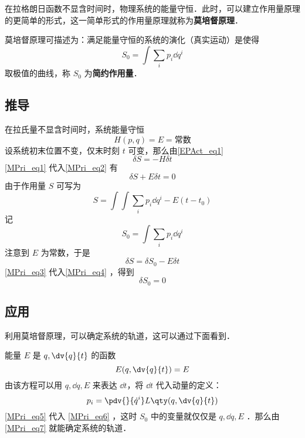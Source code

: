 在拉格朗日函数不显含时间时，物理系统的能量守恒．此时，可以建立作用量原理的更简单的形式，这一简单形式的作用量原理就称为\textbf{莫培督原理}．

莫培督原理可描述为：满足能量守恒的系统的演化（真实运动）是使得
\begin{equation}
S_0=\int\sum_i p_i\dd q^i
\end{equation}
取极值的曲线，称 $S_0$ 为\textbf{简约作用量}．
\subsection{推导}
在拉氏量不显含时间时，系统能量守恒
\begin{equation}\label{MPri_eq1}
H(p,q)=E=\text{常数}
\end{equation}
设系统初末位置不变，仅末时刻 $t$ 可变，那么由\autoref{EPAct_eq1}~
\begin{equation}\label{MPri_eq2}
\delta S=-H\delta t
\end{equation}
\autoref{MPri_eq1} 代入\autoref{MPri_eq2} 有
\begin{equation}\label{MPri_eq4}
\delta S+E\delta t=0
\end{equation}
由于作用量 $S$ 可写为
\begin{equation}
S=\int \int\sum_i p_i\dd q^i-E(t-t_0)
\end{equation}
记
\begin{equation}\label{MPri_eq6}
S_0=\int\sum_i p_i\dd q^i
\end{equation}
注意到 $E$ 为常数，于是
\begin{equation}\label{MPri_eq3}
\delta S=\delta S_0-E\delta t
\end{equation}
\autoref{MPri_eq3} 代入\autoref{MPri_eq4} ，得到
\begin{equation}\label{MPri_eq7}
\delta S_0=0
\end{equation}
\subsection{应用}
利用莫培督原理，可以确定系统的轨道，这可以通过下面看到．

能量 $E$ 是 $q,\dv{q}{t}$ 的函数 
\begin{equation}
E(q,\dv{q}{t})=E
\end{equation}
由该方程可以用 $q,\dd q,E$ 来表达 $\dd t$，将 $\dd t$ 代入动量的定义：
\begin{equation}\label{MPri_eq5}
p_i=\pdv{}{\dot q^i}L\qty(q,\dv{q}{t})
\end{equation}
\autoref{MPri_eq5} 代入 \autoref{MPri_eq6} ，这时 $S_0$ 中的变量就仅仅是 $q,\dd q, E$ ．那么由\autoref{MPri_eq7} 就能确定系统的轨道．